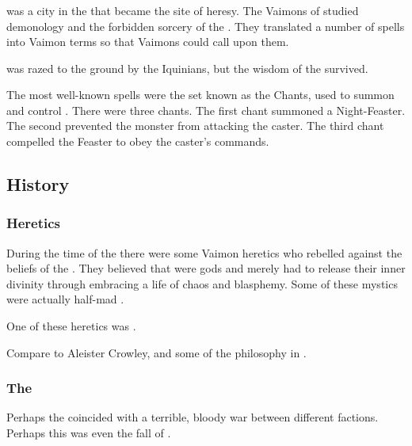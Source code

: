 \subsubsection{\Vymorja}
\index{\Vymorja}
\Vymorja was a city in the \VaimonCaliphate that became the site of heresy.
The Vaimons of \Vymorja studied demonology and the forbidden sorcery of the \ophidians.
They translated a number of \ophidian spells into Vaimon terms so that Vaimons could call upon them. 

\Vymorja was razed to the ground by the Iquinians, but the wisdom of the \Vymorjans survived.

The most well-known \Vymorjan spells were the set known as the \Vymorjan Chants, used to summon and control . 
There were three chants. 
The first chant summoned a Night-Feaster.
The second prevented the monster from attacking the caster. 
The third chant compelled the Feaster to obey the caster's commands. 









\subsection{History}





\subsubsection{Heretics}
During the time of the \VaimonCaliphate there were some Vaimon heretics who rebelled against the beliefs of the \caliphate. 
They believed that \humans{} were gods and merely had to release their inner divinity through embracing a life of chaos and blasphemy. 
Some of these mystics were actually half-mad . 

One of these heretics was . 

Compare to Aleister Crowley, and some of the philosophy in . 





\subsubsection{The \Darkfall}
\index{\Darkfall}
Perhaps the  coincided with a terrible, bloody war between different \resphan factions. 
Perhaps this was even the fall of \Kezerad. 

